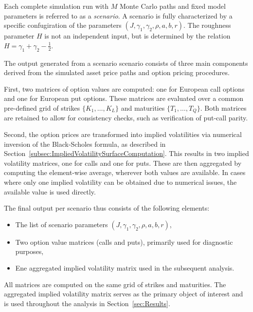 Each complete simulation run with $M$ Monte Carlo paths and fixed model parameters is referred to as a \emph{scenario}. A scenario is fully characterized by a specific confugiration of the parameters $(J, \gamma_1, \gamma_2, \rho, a, b, r)$. The roughness parameter $H$ is not an independent input, but is determined by the relation $H = \gamma_1 + \gamma_2 - \frac{1}{2}$.

The output generated from a scenario scenario consists of three main components derived from the simulated asset price paths and option pricing procedures.

First, two matrices of option values are computed: one for European call options and one for European put options. These matrices are evaluated over a common pre-defined grid of strikes $\{K_1, \ldots, K_L\}$ and maturities $\{T_1, \ldots, T_Q\}$. Both matrices are retained to allow for consistency checks, such as verification of put-call parity.

Second, the option prices are transformed into implied volatilities via numerical inversion of the Black-Scholes formula, as described in Section~\ref{subsec:ImpliedVolatilitySurfaceComputation}. This results in two implied volatility matrices, one for calls and one for puts. These are then aggregated by computing the element-wise average, wherever both values are available. In cases where only one implied volatility can be obtained due to numerical issues, the available value is used directly.

The final output per scenario thus consists of the following elements: 
\begin{itemize}
    \item The list of scenario parameters $(J, \gamma_1, \gamma_2, \rho, a, b, r)$,
    \item Two option value matrices (calls and puts), primarily used for diagnostic purposes,
    \item Ene aggregated implied volatility matrix used in the subsequent analysis.
\end{itemize}

All matrices are computed on the same grid of strikes and maturities. The aggregated implied volatility matrix serves as the primary object of interest and is used throughout the analysis in Section~\ref{sec:Results}.
